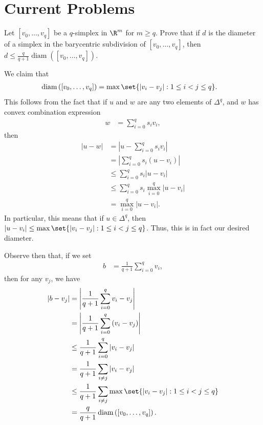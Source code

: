 \documentclass[10pt]{mypackage}
\begin{document}
\section{Current Problems}%
\begin{problem}[Problem 1]
  Let $\left[ v_0,\dots,v_q \right]$ be a $q$-simplex in $\R^m$ for $m\geq q$. Prove that if $d$ is the diameter of a simplex in the barycentric subdivision of $\left[ v_0,\dots,v_q \right]$, then $d\leq \frac{q}{q+1} \operatorname{diam}\left( \left[ v_0,\dots,v_q \right] \right)$.
\end{problem}
\begin{solution}
  We claim that
  \begin{align*}
    \operatorname{diam}\left( \left[ v_0,\dots,v_q \right] \right) &= \max\set{\left\vert v_i-v_j \right\vert : 1\leq i<j\leq q}.
  \end{align*}
  This follows from the fact that if $u$ and $w$ are any two elements of $\Delta^q$, and $w$ has convex combination expression
  \begin{align*}
    w &= \sum_{i=0}^{q}s_iv_i,
  \end{align*}
  then
  \begin{align*}
    \left\vert u-w \right\vert &= \left\vert u-\sum_{i=0}^{q}s_iv_i \right\vert\\
                               &= \left\vert \sum_{i=0}^{q}s_i \left( u-v_i \right) \right\vert\\
                               &\leq \sum_{i=0}^{q} s_i \left\vert u-v_i \right\vert\\
                               &\leq \sum_{i=0}^{q} s_i \max_{i=0}^{q} \left\vert u-v_i \right\vert\\
                               &= \max_{i=0}^{q} \left\vert u-v_i \right\vert.
  \end{align*}
  In particular, this means that if $u\in \Delta^q$, then $\left\vert u-v_i \right\vert\leq \max\set{\left\vert v_i-v_j \right\vert : 1\leq i<j\leq q}$. Thus, this is in fact our desired diameter.

  Observe then that, if we set
  \begin{align*}
    b &= \frac{1}{q+1} \sum_{i=0}^{q}v_i,
  \end{align*}
  then for any $v_j$, we have
  \begin{align*}
    \left\vert b-v_j \right\vert &= \left\vert \frac{1}{q+1}\sum_{i=0}^{q}v_i - v_j \right\vert\\
                                 &= \left\vert \frac{1}{q+1} \sum_{i=0}^{q} \left( v_i-v_j \right) \right\vert\\
                                 &\leq \frac{1}{q+1} \sum_{i=0}^{q} \left\vert v_i-v_j \right\vert\\
                                 &= \frac{1}{q+1} \sum_{i\neq j} \left\vert v_i-v_j \right\vert\\
                                 &\leq \frac{1}{q+1} \sum_{i\neq j} \max\set{\left\vert v_i-v_j \right\vert : 1\leq i < j \leq q}\\
                                 &= \frac{q}{q+1} \operatorname{diam}\left( \left[ v_0,\dots,v_q \right] \right).
  \end{align*}
\end{solution}
\end{document}
